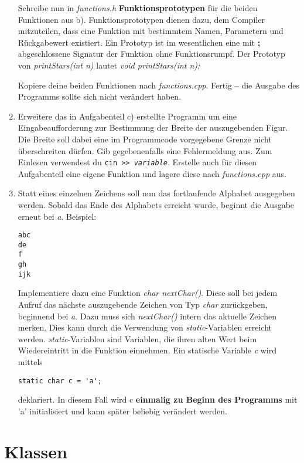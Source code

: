\documentclass[
  accentcolor=tud1c,	%
  colorbacktitle,		%
  inverttitle,			%
  german,				%
  twoside
]{tudexercise}
\begin{document}
\begin{enumerate}
Schreibe nun in \emph{functions.h} \textbf{Funktionsprototypen} für die beiden Funktionen aus b).
Funktionsprototypen dienen dazu, dem Compiler mitzuteilen, dass eine Funktion mit bestimmtem Namen, Parametern und Rückgabewert existiert.
Ein Prototyp ist im wesentlichen eine mit \textbf{;} abgeschlossene Signatur der Funktion ohne Funktionsrumpf.
Der Prototyp von \emph{printStars(int n)} lautet \emph{void printStars(int n);}

Kopiere deine beiden Funktionen nach \emph{functions.cpp}.
Fertig -- die Ausgabe des Programms sollte sich nicht verändert haben.

\item
Erweitere das in Aufgabenteil c) erstellte Programm um eine Eingabeaufforderung zur Bestimmung der Breite der auszugebenden Figur.
Die Breite soll dabei eine im Programmcode vorgegebene Grenze nicht überschreiten dürfen.
Gib gegebenenfalls eine Fehlermeldung aus.
Zum Einlesen verwendest du \texttt{cin >{}> \emph{variable}}.
Erstelle auch für diesen Aufgabenteil eine eigene Funktion und lagere diese nach \emph{functions.cpp} aus.

\item Statt eines einzelnen Zeichens soll nun das fortlaufende Alphabet ausgegeben werden.
Sobald das Ende des Alphabets erreicht wurde, beginnt die Ausgabe erneut bei \emph{a}. Beispiel:
\begin{lstlisting}
abc
de
f
gh
ijk
\end{lstlisting}

Implementiere dazu eine Funktion \emph{char nextChar()}.
Diese soll bei jedem Aufruf das nächste auszugebende Zeichen von Typ \emph{char} zurückgeben, beginnend bei \emph{\textquotesingle a\textquotesingle}.
Dazu muss sich \emph{nextChar()} intern das aktuelle Zeichen merken.
Dies kann durch die Verwendung von \emph{static}-Variablen erreicht werden. \emph{static}-Variablen sind Variablen, die ihren alten Wert beim Wiedereintritt in die Funktion einnehmen.
Ein statische Variable \emph{c} wird mittels 
\begin{lstlisting}
static char c = 'a';
\end{lstlisting}
deklariert.
In diesem Fall wird c \textbf{einmalig zu Beginn des Programms} mit 'a' initialisiert und kann später beliebig verändert werden.
\end{enumerate} 

\section{Klassen}
\end{document}
